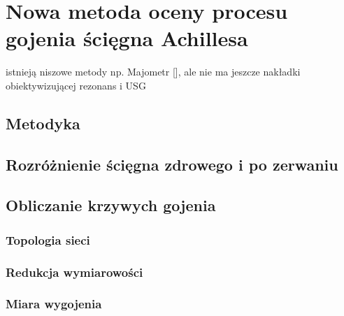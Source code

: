 \chapter{Nowa metoda oceny procesu gojenia ścięgna Achillesa}
istnieją niszowe metody np. Majometr [], ale nie ma jeszcze nakładki obiektywizującej rezonans i USG
\section{Metodyka}
\section{Rozróżnienie ścięgna zdrowego i po zerwaniu}
\section{Obliczanie krzywych gojenia}
\subsection{Topologia sieci}
\subsection{Redukcja wymiarowości}
\subsection{Miara wygojenia}